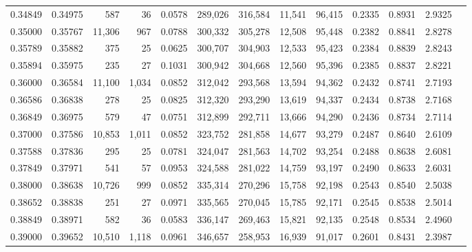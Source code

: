 \begin{tabular}{rrrrrrrrrrrrr}
0.34849 & 0.34975 &    587 &    36 &                                     0.0578 & 289,026 & 316,584 &  11,541 &  96,415 & 0.2335 & 0.8931 & 2.9325 \\
0.35000 & 0.35767 & 11,306 &   967 &                                     0.0788 & 300,332 & 305,278 &  12,508 &  95,448 & 0.2382 & 0.8841 & 2.8278 \\
0.35789 & 0.35882 &    375 &    25 &                                     0.0625 & 300,707 & 304,903 &  12,533 &  95,423 & 0.2384 & 0.8839 & 2.8243 \\
0.35894 & 0.35975 &    235 &    27 &                                     0.1031 & 300,942 & 304,668 &  12,560 &  95,396 & 0.2385 & 0.8837 & 2.8221 \\
0.36000 & 0.36584 & 11,100 & 1,034 &                                     0.0852 & 312,042 & 293,568 &  13,594 &  94,362 & 0.2432 & 0.8741 & 2.7193 \\
0.36586 & 0.36838 &    278 &    25 &                                     0.0825 & 312,320 & 293,290 &  13,619 &  94,337 & 0.2434 & 0.8738 & 2.7168 \\
0.36849 & 0.36975 &    579 &    47 &                                     0.0751 & 312,899 & 292,711 &  13,666 &  94,290 & 0.2436 & 0.8734 & 2.7114 \\
0.37000 & 0.37586 & 10,853 & 1,011 &                                     0.0852 & 323,752 & 281,858 &  14,677 &  93,279 & 0.2487 & 0.8640 & 2.6109 \\
0.37588 & 0.37836 &    295 &    25 &                                     0.0781 & 324,047 & 281,563 &  14,702 &  93,254 & 0.2488 & 0.8638 & 2.6081 \\
0.37849 & 0.37971 &    541 &    57 &                                     0.0953 & 324,588 & 281,022 &  14,759 &  93,197 & 0.2490 & 0.8633 & 2.6031 \\
0.38000 & 0.38638 & 10,726 &   999 &                                     0.0852 & 335,314 & 270,296 &  15,758 &  92,198 & 0.2543 & 0.8540 & 2.5038 \\
0.38652 & 0.38838 &    251 &    27 &                                     0.0971 & 335,565 & 270,045 &  15,785 &  92,171 & 0.2545 & 0.8538 & 2.5014 \\
0.38849 & 0.38971 &    582 &    36 &                                     0.0583 & 336,147 & 269,463 &  15,821 &  92,135 & 0.2548 & 0.8534 & 2.4960 \\
0.39000 & 0.39652 & 10,510 & 1,118 &                                     0.0961 & 346,657 & 258,953 &  16,939 &  91,017 & 0.2601 & 0.8431 & 2.3987 \\

\end{tabular}

